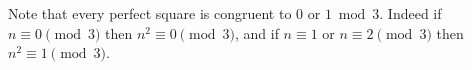 Note that every perfect square is congruent to $0$ or $1 \bmod 3$.
Indeed if $n \equiv 0 \pmod{3}$ then $n^{2} \equiv 0 \pmod{3}$, and if $n \equiv 1$ or $n \equiv 2 \pmod{3}$ then $n^{2} \equiv 1 \pmod{3}$.